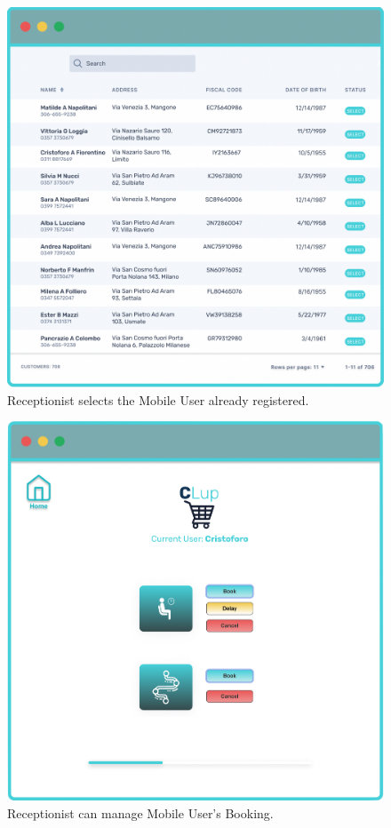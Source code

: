 \begin{figure}[H]
  \caption{Receptionist selects the Mobile User already registered.}
  \label{fig:Login}
  \centering
  \includegraphics[scale=0.32]{images/mockup/Select_User.png}

\end{figure}

\begin{figure}[H]
  \caption{Receptionist can manage Mobile User's Booking.}
  \label{fig:Login}
  \centering
  \includegraphics[scale=0.32]{images/mockup/Home_Rec.png}

\end{figure}


